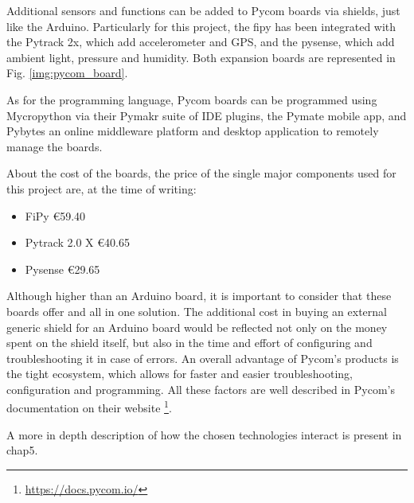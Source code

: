 		Additional sensors and functions can be added to Pycom boards via shields, just like the Arduino.
		Particularly for this project, the fipy has been integrated with the Pytrack 2x, which add accelerometer and GPS, and the pysense, which add ambient light, pressure and humidity.
		Both expansion boards are represented in Fig. \ref{img:pycom_board}.
				
		As for the programming language, Pycom boards can be programmed using Mycropython via their Pymakr suite of IDE plugins, the Pymate mobile app, and Pybytes an online middleware platform and desktop application to remotely manage the boards.
		
		About the cost of the boards, the price of the single major components used for this project are, at the time of writing:
		\begin{itemize}[noitemsep]
			\item FiPy €59.40
			\item Pytrack 2.0 X €40.65
			\item Pysense €29.65
		\end{itemize}
		
		Although higher than an Arduino board, it is important to consider that these boards offer and all in one solution.
		The additional cost in buying an external generic shield for an Arduino board would be reflected not only on the money spent on the shield itself, but also in the time and effort of configuring and troubleshooting it in case of errors.
		An overall advantage of Pycom's products is the tight ecosystem, which allows for faster and easier troubleshooting, configuration and programming.
		All these factors are well described in Pycom's documentation on their website \footnote{\url{https://docs.pycom.io/}}.
		
		A more in depth description of how the chosen technologies interact is present in chap5.	